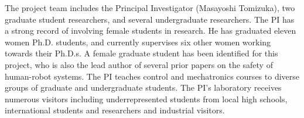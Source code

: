 The project team includes the Principal Investigator (Masayoshi Tomizuka), two graduate student researchers, and several undergraduate researchers. The PI has a strong record of involving female students in research. He has graduated eleven women Ph.D. students, and currently supervises six other women working towards their Ph.D.s. A female graduate student has been identified for this project, who is also the lead author of several prior papers on the safety of human-robot systems. The PI teaches control and mechatronics courses to diverse groups of graduate and undergraduate students. The PI's laboratory receives numerous visitors including underrepresented students from local high schools, international students and researchers and industrial visitors. %
